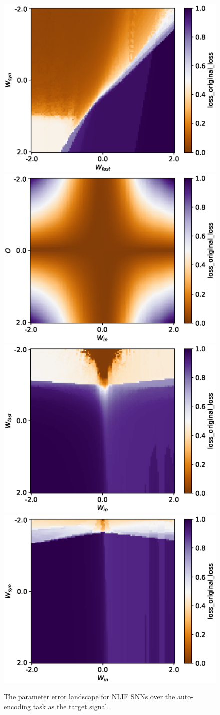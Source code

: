 \documentclass[mphil,deptreport,ianc]{infthesis} %
\begin{document}
\begin{figure}
    \centering
    \includegraphics[width=0.49\columnwidth]{figures/param_landscape_heatmaps/gating/NLIF/test_export_2d_heatmap_N_4_loss_original_loss_W_fast_W_syn.eps}
    \includegraphics[width=0.49\columnwidth]{figures/param_landscape_heatmaps/gating/NLIF/test_export_2d_heatmap_N_4_loss_original_loss_W_in_O.eps}
    \includegraphics[width=0.49\columnwidth]{figures/param_landscape_heatmaps/gating/NLIF/test_export_2d_heatmap_N_4_loss_original_loss_W_in_W_fast.eps}
    \includegraphics[width=0.49\columnwidth]{figures/param_landscape_heatmaps/gating/NLIF/test_export_2d_heatmap_N_4_loss_original_loss_W_in_W_syn.eps}
    \caption{The parameter error landscape for NLIF SNNs over the auto-encoding task as the target signal.}
    \label{fig:p_landscape_NLIF_autoencoding}
\end{figure}
\end{document}
